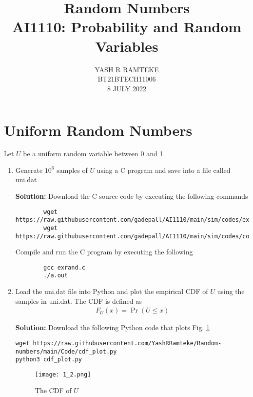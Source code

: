 \documentclass[journal,12pt,twocolumn]{IEEEtran}
\title{Random Numbers \\
\Large AI1110: Probability and Random Variables}\\
\author{YASH R RAMTEKE \\ \normalsize BT21BTECH11006\\ \vspace*{20pt} \normalsize  8 JULY 2022}
\newcommand{\solution}{\noindent \textbf{Solution: }}
\providecommand{\pr}[1]{\ensuremath{\Pr\left(#1\right)}}
\numberwithin{equation}{section}
\renewcommand\thesection{\arabic{section}}
\begin{document}
	\maketitle
	
	\section{Uniform Random Numbers}
	Let $U$ be a uniform random variable between 0 and 1.
	\begin{enumerate}[label=\thesection.\arabic*,ref=\thesection.\theenumi]
	\item Generate $10^6$ samples of $U$ using a C program and save into a file called uni.dat

	\solution Download the C source code by executing the following commands
	\begin{lstlisting}
		wget https://raw.githubusercontent.com/gadepall/AI1110/main/sim/codes/exrand.c
		wget https://raw.githubusercontent.com/gadepall/AI1110/main/sim/codes/coeffs.h
	\end{lstlisting}
	Compile and run the C program by executing the following
	\begin{lstlisting}
		gcc exrand.c
		./a.out
	\end{lstlisting}
	
	\item Load the uni.dat file into Python and plot the empirical CDF of $U$ using the samples in uni.dat. The CDF is defined as
	\begin{align}
		F_{U}(x) = \pr{U \le x}
	\end{align}
	
	\solution  Download the following Python code that plots Fig. \ref{fig-1_2}
	\begin{lstlisting}
wget https://raw.githubusercontent.com/YashRRamteke/Random-numbers/main/Code/cdf_plot.py
python3 cdf_plot.py
	\end{lstlisting}
	\begin{figure}
		\centering
		\texttt{[image: 1\_2.png]}
		\caption{The CDF of $U$}
		\label{fig-1_2}
	\end{figure}
	

\end{enumerate}
\end{document}

